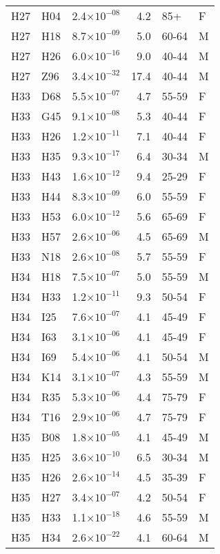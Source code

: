 \begin{longtable}{lllrll}
   H27 & H04 & 2.4$\times10^{-08}$ & 4.2 & 85+ & F \\ 
   H27 & H18 & 8.7$\times10^{-09}$ & 5.0 & 60-64 & M \\ 
   H27 & H26 & 6.0$\times10^{-16}$ & 9.0 & 40-44 & M \\ 
   H27 & Z96 & 3.4$\times10^{-32}$ & 17.4 & 40-44 & M \\ 
   H33 & D68 & 5.5$\times10^{-07}$ & 4.7 & 55-59 & F \\ 
   H33 & G45 & 9.1$\times10^{-08}$ & 5.3 & 40-44 & F \\ 
   H33 & H26 & 1.2$\times10^{-11}$ & 7.1 & 40-44 & F \\ 
   H33 & H35 & 9.3$\times10^{-17}$ & 6.4 & 30-34 & M \\ 
   H33 & H43 & 1.6$\times10^{-12}$ & 9.4 & 25-29 & F \\ 
   H33 & H44 & 8.3$\times10^{-09}$ & 6.0 & 55-59 & F \\ 
   H33 & H53 & 6.0$\times10^{-12}$ & 5.6 & 65-69 & F \\ 
   H33 & H57 & 2.6$\times10^{-06}$ & 4.5 & 65-69 & M \\ 
   H33 & N18 & 2.6$\times10^{-08}$ & 5.7 & 55-59 & F \\ 
   H34 & H18 & 7.5$\times10^{-07}$ & 5.0 & 55-59 & M \\ 
   H34 & H33 & 1.2$\times10^{-11}$ & 9.3 & 50-54 & F \\ 
   H34 & I25 & 7.6$\times10^{-07}$ & 4.1 & 45-49 & F \\ 
   H34 & I63 & 3.1$\times10^{-06}$ & 4.1 & 45-49 & F \\ 
   H34 & I69 & 5.4$\times10^{-06}$ & 4.1 & 50-54 & M \\ 
   H34 & K14 & 3.1$\times10^{-07}$ & 4.3 & 55-59 & M \\ 
   H34 & R35 & 5.3$\times10^{-06}$ & 4.4 & 75-79 & F \\ 
   H34 & T16 & 2.9$\times10^{-06}$ & 4.7 & 75-79 & F \\ 
   H35 & B08 & 1.8$\times10^{-05}$ & 4.1 & 45-49 & M \\ 
   H35 & H25 & 3.6$\times10^{-10}$ & 6.5 & 30-34 & M \\ 
   H35 & H26 & 2.6$\times10^{-14}$ & 4.5 & 35-39 & F \\ 
   H35 & H27 & 3.4$\times10^{-07}$ & 4.2 & 50-54 & F \\ 
   H35 & H33 & 1.1$\times10^{-18}$ & 4.6 & 55-59 & M \\ 
   H35 & H34 & 2.6$\times10^{-22}$ & 4.1 & 60-64 & M \\ 

\end{longtable}
